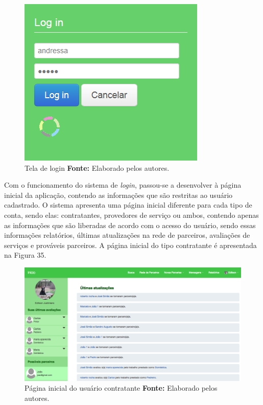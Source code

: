 \begin{figure}[h!]
	\centerline{\includegraphics[scale=0.60]{./imagens/login.jpg}}
	\caption[Tela de login ]
	{Tela de login \textbf{Fonte:} Elaborado pelos autores.}
	\label{fig:exemplo1}
\end{figure}

\par Com o funcionamento do sistema de \textit{login}, passou-se a desenvolver à página inicial da aplicação, contendo as informações que são restritas ao usuário cadastrado. O sistema apresenta uma página inicial diferente para cada tipo de conta, sendo elas: contratantes, provedores de serviço ou ambos, contendo apenas as informações que são liberadas de acordo com o acesso do usuário, sendo essas informações relatórios, últimas atualizações na rede de parceiros, avaliações de serviços e prováveis parceiros. A página inicial do tipo contratante é apresentada na Figura 35.

\begin{figure}[h!]
	\centerline{\includegraphics[scale=0.35]{./imagens/home-contratante.png}}
	\caption[Página inicial do usuário contratante]
	{Página inicial do usuário contratante \textbf{Fonte:} Elaborado pelos autores.}
	\label{fig:exemplo1}
\end{figure}


